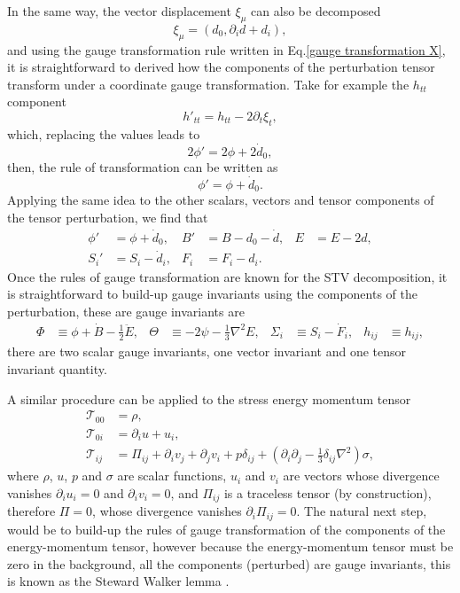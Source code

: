 \documentclass{article}
\begin{document}
In the same way, the vector displacement $\xi_{\mu}$ can also be decomposed
\begin{equation}
    \xi_{\mu} = \left(d_0, \partial_i d + d_i\right),
\end{equation}
and using the gauge transformation rule written in Eq.\eqref{gauge transformation X},
it is straightforward to derived how the components of the perturbation tensor transform
under a coordinate gauge transformation. Take for example the $h_{tt}$ component
\begin{equation}
    h'_{tt} = h_{tt} - 2\partial_{t}\xi_{t},
\end{equation}
which, replacing the values leads to
\begin{equation}
    2\phi' = 2\phi + 2\dot{d}_0,
\end{equation}
then, the rule of transformation can be written as
\begin{equation}
    \phi' = \phi + \dot{d}_0.
\end{equation}
Applying the same idea to the other scalars, vectors and tensor components of the
tensor perturbation, we find that 
\begin{align}
    \phi' & = \phi + \dot{d}_0, & B' & = B - d_0 - \dot{d}, & E & = E - 2d, \\
    S_i' & = S_i - \dot{d}_i, & F_i & = F_i - d_i.
\end{align}
Once the rules of gauge transformation are known for the STV decomposition, it is
straightforward to build-up gauge invariants using the components of the perturbation, 
these are gauge invariants are
\begin{align}
    \Phi & \equiv \phi + \dot{B} - \frac{1}{2}\ddot{E}, &
    \Theta & \equiv -2\psi - \frac{1}{3}\nabla^2E, &
    \Sigma_{i} & \equiv S_i - \dot{F}_i, &
    h_{ij} & \equiv h_{ij},
\end{align}
there are two scalar gauge invariants, one vector invariant and one tensor invariant
quantity.

A similar procedure can be applied to the stress energy momentum tensor
\begin{align}
    \label{energy momentum tensor svt}
    \mathcal{T}_{00} & = \rho, \\ 
    \mathcal{T}_{0i} & = \partial_{i}u + u_i, \\
    \mathcal{T}_{ij} & = \Pi_{ij} + \partial_{i}v_{j} + \partial_{j}v_{i} + p\delta_{ij}
    + \left(\partial_{i}\partial_{j} - \frac{1}{3}\delta_{ij}\nabla^{2}\right)\sigma,
\end{align}
where $\rho$, $u$, $p$ and $\sigma$ are scalar functions, $u_i$ and $v_i$ are vectors
whose divergence vanishes $\partial_{i}u_{i} = 0 $ and $\partial_{i}v_{i} = 0$, and $\Pi_{ij}$
is a traceless tensor (by construction), therefore $\Pi = 0$, whose divergence vanishes 
$\partial_{i}\Pi_{ij} = 0$. The natural next step, would be to build-up the rules of
gauge transformation of the components of the energy-momentum tensor, however because 
the energy-momentum tensor must be zero in the background, all the components
(perturbed) are gauge invariants, this is known as the Steward Walker lemma 
\cite{stewart1993advanced}.
\end{document}
